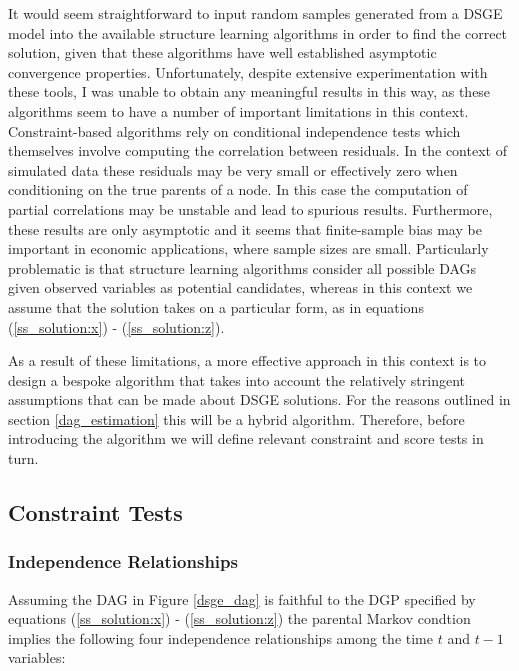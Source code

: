 \documentclass{article}
\begin{document}
It would seem straightforward to input random samples generated from a DSGE model into the available structure learning algorithms in order to find the correct solution, given that these algorithms have well established asymptotic convergence properties. Unfortunately, despite extensive experimentation with these tools, I was unable to obtain any meaningful results in this way, as these algorithms seem to have a number of important limitations in this context. Constraint-based algorithms rely on conditional independence tests which themselves involve computing the correlation between residuals. In the context of simulated data these residuals may be very small or effectively zero when conditioning on the true parents of a node. In this case the computation of partial correlations may be unstable and lead to spurious results. Furthermore, these results are only asymptotic and it seems that finite-sample bias may be important in economic applications, where sample sizes are small. Particularly problematic is that structure learning algorithms consider all possible DAGs given observed variables as potential candidates, whereas in this context we assume that the solution takes on a particular form, as in equations (\ref{ss_solution:x}) - (\ref{ss_solution:z}).

As a result of these limitations, a more effective approach in this context is to design a bespoke algorithm that takes into account the relatively stringent assumptions that can be made about DSGE solutions. For the reasons outlined in section \ref{dag_estimation} this will be a hybrid algorithm. Therefore, before introducing the algorithm we will define relevant constraint and score tests in turn.

\subsection{Constraint Tests} \label{constrainttests}

\subsubsection{Independence Relationships}

Assuming the DAG in Figure \ref{dsge_dag} is faithful to the DGP specified by equations (\ref{ss_solution:x}) - (\ref{ss_solution:z}) the parental Markov condtion implies the following four independence relationships among the time $t$ and $t-1$ variables:
\end{document}
